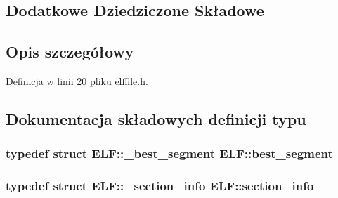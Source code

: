 \subsection*{Dodatkowe Dziedziczone Składowe}


\subsection{Opis szczegółowy}


Definicja w linii 20 pliku elffile.\-h.



\subsection{Dokumentacja składowych definicji typu}
\hypertarget{class_e_l_f_acc32d4569fb28ff6c041c20870d8c2e7}{
\subsubsection[{best\-\_\-segment}]{\setlength{\rightskip}{0pt plus 5cm}typedef struct {\bf E\-L\-F\-::\-\_\-best\-\_\-segment}  {\bf E\-L\-F\-::best\-\_\-segment}\hspace{0.3cm}{\ttfamily [private]}}}\label{class_e_l_f_acc32d4569fb28ff6c041c20870d8c2e7}
\hypertarget{class_e_l_f_a453c51d672396e7f5f328153f55e94bc}{
\subsubsection[{section\-\_\-info}]{\setlength{\rightskip}{0pt plus 5cm}typedef struct {\bf E\-L\-F\-::\-\_\-section\-\_\-info}  {\bf E\-L\-F\-::section\-\_\-info}\hspace{0.3cm}{\ttfamily [private]}}}\label{class_e_l_f_a453c51d672396e7f5f328153f55e94bc}


